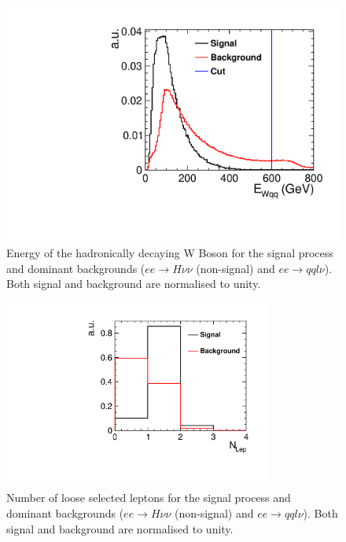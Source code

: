 \begin{figure}
  \centering
    \includegraphics[width=0.78\linewidth,keepaspectratio]{HiggsAnalysis/figures/EWqq_PreSelection}
    \caption[Energy of the hadronically decaying W Boson for signal and background events]{Energy of the hadronically decaying W Boson for the signal process and dominant backgrounds ($ee\rightarrow H\nu\nu$ (non-signal) and $ee\rightarrow qql\nu$). Both signal and background are normalised to unity.}
  \label{fig:WPreSel}
\end{figure}

\begin{figure}
  \centering
  \includegraphics[width=0.78\textwidth,keepaspectratio]{HiggsAnalysis/figures/nLep_PreSelection}
  \caption[Number of reconstructed loose selected lepton for signal and background events]{Number of loose selected leptons for the signal process and dominant backgrounds ($ee\rightarrow H\nu\nu$ (non-signal) and $ee\rightarrow qql\nu$). Both signal and background are normalised to unity.}
  \label{fig:nLepPreSel}
\end{figure}

